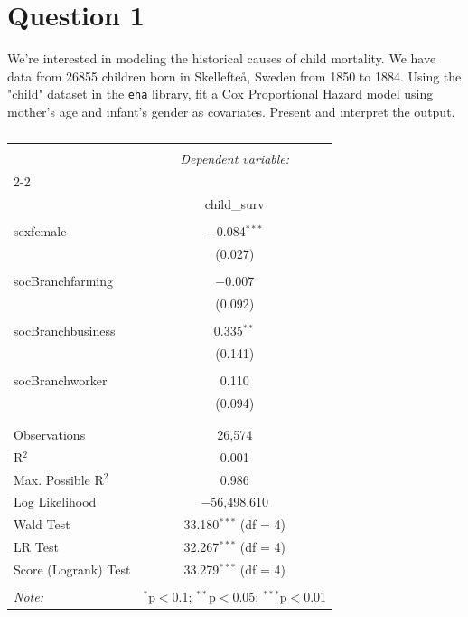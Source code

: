 \documentclass[12pt,letterpaper]{article}
\begin{document}
\section*{Question 1}
\vspace{.25cm}
\noindent We're interested in modeling the historical causes of child mortality. We have data from 26855 children born in Skellefteå, Sweden from 1850 to 1884. Using the "child" dataset in the \texttt{eha} library, fit a Cox Proportional Hazard model using mother's age and infant's gender as covariates. Present and interpret the output.
\begin{table}[H] \centering 
	\caption{} 
	\label{} 
	\begin{tabular}{@{\extracolsep{5pt}}lc} 
		\\[-1.8ex]\hline 
		\hline \\[-1.8ex] 
		& \multicolumn{1}{c}{\textit{Dependent variable:}} \\ 
		\cline{2-2} 
		\\[-1.8ex] & child\_surv \\ 
		\hline \\[-1.8ex] 
		sexfemale & $-$0.084$^{***}$ \\ 
		& (0.027) \\ 
		& \\ 
		socBranchfarming & $-$0.007 \\ 
		& (0.092) \\ 
		& \\ 
		socBranchbusiness & 0.335$^{**}$ \\ 
		& (0.141) \\ 
		& \\ 
		socBranchworker & 0.110 \\ 
		& (0.094) \\ 
		& \\ 
		\hline \\[-1.8ex] 
		Observations & 26,574 \\ 
		R$^{2}$ & 0.001 \\ 
		Max. Possible R$^{2}$ & 0.986 \\ 
		Log Likelihood & $-$56,498.610 \\ 
		Wald Test & 33.180$^{***}$ (df = 4) \\ 
		LR Test & 32.267$^{***}$ (df = 4) \\ 
		Score (Logrank) Test & 33.279$^{***}$ (df = 4) \\ 
		\hline 
		\hline \\[-1.8ex] 
		\textit{Note:}  & \multicolumn{1}{r}{$^{*}$p$<$0.1; $^{**}$p$<$0.05; $^{***}$p$<$0.01} \\ 
	\end{tabular} 
\end{table}
\end{document}
